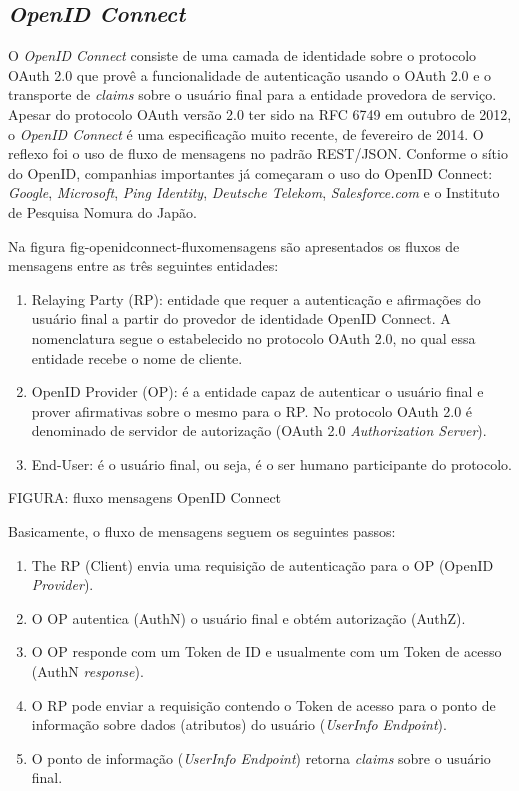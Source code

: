 \documentclass{doublecol-new}
\begin{document}
	
\subsection{\textit{OpenID Connect}}
	
O \textit{OpenID Connect} consiste de uma camada de identidade sobre o protocolo OAuth 2.0 que provê a funcionalidade de autenticação usando o OAuth 2.0 e o transporte de \textit{claims} sobre o usuário final para a entidade provedora de serviço. Apesar do protocolo OAuth versão 2.0 ter sido na RFC 6749 em outubro de 2012, o \textit{OpenID Connect} é uma especificação muito recente, de fevereiro de 2014. O reflexo foi o uso de fluxo de mensagens no padrão REST/JSON. Conforme o sítio do OpenID, companhias importantes já começaram o uso do OpenID Connect: \textit{Google}, \textit{Microsoft}, \textit{Ping Identity}, \textit{Deutsche Telekom}, \textit{Salesforce.com} e o Instituto de Pesquisa Nomura do Japão.
	
Na figura fig-openidconnect-fluxomensagens são apresentados os fluxos de mensagens entre as três seguintes entidades:
	
\begin{enumerate}
	\item Relaying Party (RP): entidade que requer a autenticação e afirmações do usuário final a partir do provedor de identidade OpenID Connect. A nomenclatura segue o estabelecido no protocolo OAuth 2.0, no qual essa entidade recebe o nome de cliente.
	\item OpenID Provider (OP): é a entidade capaz de autenticar o usuário final e prover afirmativas sobre o mesmo para o RP. No protocolo OAuth 2.0 é denominado de servidor de autorização (OAuth 2.0 \textit{Authorization Server}).
	\item End-User: é o usuário final, ou seja, é o ser humano participante do protocolo.
\end{enumerate}
		
FIGURA: fluxo mensagens OpenID Connect
			
Basicamente, o fluxo de mensagens seguem os seguintes passos:
\begin{enumerate}
	\item The RP (Client) envia uma requisição de autenticação para o OP (OpenID \textit{Provider}).
	\item O OP autentica (AuthN) o usuário final e obtém autorização (AuthZ).
	\item O OP responde com um Token de ID e usualmente com um Token de acesso (AuthN \textit{response}).
	\item O RP pode enviar a requisição contendo o Token de acesso para o ponto de informação sobre dados (atributos) do usuário (\textit{UserInfo Endpoint}).
	\item O ponto de informação (\textit{UserInfo Endpoint}) retorna \textit{claims} sobre o usuário final.
\end{enumerate}
				
\end{document}
